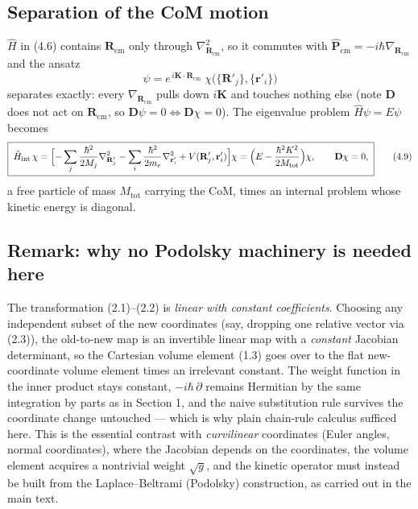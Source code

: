 \documentclass{article}
\begin{document}
\subsection{Separation of the CoM motion}

$\hat H$ in (4.6) contains $\mathbf{R}_{\mathrm{cm}}$ only through $\nabla^2_{\mathbf{R}_{\mathrm{cm}}}$, so it commutes with $\hat{\mathbf{P}}_{\mathrm{cm}}=-i\hbar\nabla_{\mathbf{R}_{\mathrm{cm}}}$ and the ansatz
\begin{equation}
\psi=e^{\,i\mathbf{K}\cdot\mathbf{R}_{\mathrm{cm}}}\;\chi\bigl(\{\mathbf{R}'_j\},\{\mathbf{r}'_i\}\bigr) \tag{4.8}
\end{equation}
separates exactly: every $\nabla_{\mathbf{R}_{\mathrm{cm}}}$ pulls down $i\mathbf{K}$ and touches nothing else (note $\mathbf{D}$ does not act on $\mathbf{R}_{\mathrm{cm}}$, so $\mathbf{D}\psi=0\Leftrightarrow\mathbf{D}\chi=0$). The eigenvalue problem $\hat H\psi=E\psi$ becomes
\begin{equation}
\boxed{\;\hat H_{\mathrm{int}}\,\chi=\Bigl[-\sum_j\frac{\hbar^2}{2M_j}\nabla^2_{\mathbf{R}'_j}
-\sum_i\frac{\hbar^2}{2m_e}\nabla^2_{\mathbf{r}'_i}
+V(\mathbf{R}'_j,\mathbf{r}'_i)\Bigr]\chi
=\Bigl(E-\frac{\hbar^2K^2}{2M_{\mathrm{tot}}}\Bigr)\chi,\qquad \mathbf{D}\chi=0, \;} \tag{4.9}
\end{equation}
a free particle of mass $M_{\mathrm{tot}}$ carrying the CoM, times an internal problem whose kinetic energy is diagonal.

\subsection{Remark: why no Podolsky machinery is needed here}

The transformation (2.1)--(2.2) is \emph{linear with constant coefficients}. Choosing any independent subset of the new coordinates (say, dropping one relative vector via (2.3)), the old-to-new map is an invertible linear map with a \emph{constant} Jacobian determinant, so the Cartesian volume element (1.3) goes over to the flat new-coordinate volume element times an irrelevant constant. The weight function in the inner product stays constant, $-i\hbar\,\partial$ remains Hermitian by the same integration by parts as in Section 1, and the naive substitution rule survives the coordinate change untouched --- which is why plain chain-rule calculus sufficed here. This is the essential contrast with \emph{curvilinear} coordinates (Euler angles, normal coordinates), where the Jacobian depends on the coordinates, the volume element acquires a nontrivial weight $\sqrt{g}$, and the kinetic operator must instead be built from the Laplace--Beltrami (Podolsky) construction, as carried out in the main text.
\end{document}
